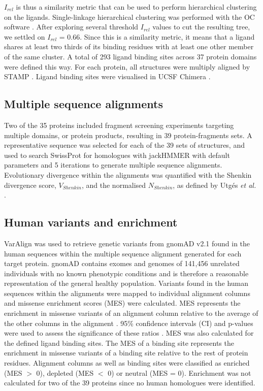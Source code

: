 $I_{rel}$ is thus a similarity metric that can be used to perform hierarchical clustering on the ligands. Single-linkage hierarchical clustering was performed with the OC software \cite{BARTON_1993_OC}. After exploring several threshold $I_{rel}$ values to cut the resulting tree, we settled on $I_{rel}$ = 0.66. Since this is a similarity metric, it means that a ligand shares at least two thirds of its binding residues with at least one other member of the same cluster. A total of 293 ligand binding sites across 37 protein domains were defined this way. For each protein, all structures were multiply aligned by STAMP \cite{RUSSELL_1992_STAMP}. Ligand binding sites were visualised in UCSF Chimera \cite{PETTERSEN_2004_CHIMERA}.

\subsection{Multiple sequence alignments}

Two of the 35 proteins included fragment screening experiments targeting multiple domains, or protein products, resulting in 39 protein-fragments sets. A representative sequence was selected for each of the 39 sets of structures, and used to search SwissProt \cite{BOUTET_2016_UNIPROT} for homologues with jackHMMER \cite{EDDY_1995_HMMER} with default parameters and 5 iterations to generate multiple sequence alignments. Evolutionary divergence within the alignments was quantified with the Shenkin divergence score, $V_{Shenkin}$, \cite{SHENKIN_1991_SCORE} and the normalised $N_{Shenkin}$, as defined by Utgés \textit{et al.} \cite{UTGES_2021_ANKS}.

\subsection{Human variants and enrichment}

VarAlign \cite{MACGOWAN_2020_DRSASP} was used to retrieve genetic variants from gnomAD v2.1 \cite{KARCZEWSKI_2020_GNOMAD} found in the human sequences within the multiple sequence alignment generated for each target protein. gnomAD contains exomes and genomes of 141,456 unrelated individuals with no known phenotypic conditions and is therefore a reasonable representation of the general healthy population. Variants found in the human sequences within the alignments were mapped to individual alignment columns and missense enrichment scores (MES) were calculated. MES represents the enrichment in missense variants of an alignment column relative to the average of the other columns in the alignment \cite{MACGOWAN_2017_VARIANTS, MACGOWAN_2024_VARIANTS}. 95\% confidence intervals (CI) and p-values were used to assess the significance of these ratios \cite{SZUMILAS_2010_ODDSRATIOS}. MES was also calculated for the defined ligand binding sites. The MES of a binding site represents the enrichment in missense variants of a binding site relative to the rest of protein residues. Alignment columns as well as binding sites were classified as enriched (MES $>$ 0), depleted (MES $<$ 0) or neutral (MES = 0). Enrichment was not calculated for two of the 39 proteins since no human homologues were identified.

